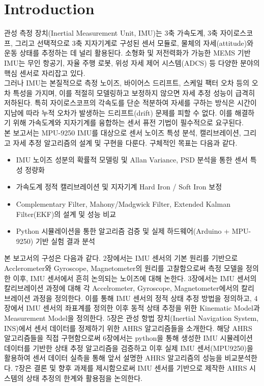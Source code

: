 \section{Introduction}
    관성 측정 장치(Inertial Measurement Unit, IMU)는 3축 가속도계, 3축 자이로스코프, 그리고 선택적으로 3축 지자기계로 구성된 센서 모듈로, 물체의 자세(attitude)와 운동 상태를 추정하는 데 널리 활용된다. 소형화 및 저전력화가 가능한 MEMS 기반 IMU는 무인 항공기, 자율 주행 로봇, 위성 자세 제어 시스템(ADCS) 등 다양한 분야의 핵심 센서로 자리잡고 있다.\\

    그러나 IMU는 본질적으로 측정 노이즈, 바이어스 드리프트, 스케일 팩터 오차 등의 오차 특성을 가지며, 이를 적절히 모델링하고 보정하지 않으면 자세 추정 성능이 급격히 저하된다. 특히 자이로스코프의 각속도를 단순 적분하여 자세를 구하는 방식은 시간이 지남에 따라 누적 오차가 발생하는 드리프트(drift) 문제를 피할 수 없다. 이를 해결하기 위해 가속도계와 지자기계를 융합하는 센서 퓨전 기법이 필수적으로 요구된다.\\

    본 보고서는 MPU-9250 IMU를 대상으로 센서 노이즈 특성 분석, 캘리브레이션, 그리고 자세 추정 알고리즘의 설계 및 구현을 다룬다. 구체적인 목표는 다음과 같다.\\

    \begin{itemize}
        \item IMU 노이즈 성분의 확률적 모델링 및 Allan Variance, PSD 분석을 통한 센서 특성 정량화\cite{smith2023}
        \item 가속도계 정적 캘리브레이션 및 지자기계 Hard Iron / Soft Iron 보정
        \item Complementary Filter, Mahony/Madgwick Filter, Extended Kalman Filter(EKF)의 설계 및 성능 비교
        \item Python 시뮬레이션을 통한 알고리즘 검증 및 실제 하드웨어(Arduino + MPU-9250) 기반 실험 결과 분석
    \end{itemize}

    본 보고서의 구성은 다음과 같다. 2장에서는 IMU 센서의 기본 원리를 기반으로 Acclerometer와 Gyroscope, Magnetometer의 원리를 고찰함으로써 측정 모델을 정의한 이후, IMU 센서에서 흔히 논의되는 노이즈에 대해 논한다. 3장에서는 IMU 센서의 칼리브레이션 과정에 대해 각 Accelrometer, Gyroscope, Magnetometer에서의 칼리브레이션 과정을 정의한다. 이를 통해 IMU 센서의 정적 상태 추정 방법을 정의하고, 4장에서 IMU 센서의 좌표계를 정의한 이후 동적 상태 추정을 위한 Kinematic Model과 Measurement Model을 정의한다. 5장은 관성 항법 장치(Inertial Navigation System, INS)에서 센서 데이터를 정제하기 위한 AHRS 알고리즘들을 소개한다. 해당 AHRS 알고리즘들을 직접 구현함으로써 6장에서는 python을 통해 생성한 IMU 시뮬레이션 데이터를 기반한 상태 추정 알고리즘을 검증하고 이후 실제 IMU 센서(MPU9250)을 활용하여 센서 데이터 실측을 통해 앞서 설명한 AHRS 알고리즘의 성능을 비교분석한다. 7장은 결론 및 향후 과제를 제시함으로써 IMU 센서를 기반으로 제작한 AHRS 시스템의 상태 추정의 한계와 활용점을 논의한다.\\